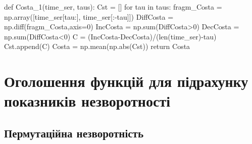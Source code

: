 \documentclass[
  letterpaper,
]{report}
\newenvironment{Shaded}{\begin{snugshade}}{\end{snugshade}}
\newcommand{\BuiltInTok}[1]{\textcolor[rgb]{0.00,0.23,0.31}{#1}}
\newcommand{\ControlFlowTok}[1]{\textcolor[rgb]{0.00,0.23,0.31}{#1}}
\newcommand{\DecValTok}[1]{\textcolor[rgb]{0.68,0.00,0.00}{#1}}
\newcommand{\KeywordTok}[1]{\textcolor[rgb]{0.00,0.23,0.31}{#1}}
\newcommand{\NormalTok}[1]{\textcolor[rgb]{0.00,0.23,0.31}{#1}}
\newcommand{\OperatorTok}[1]{\textcolor[rgb]{0.37,0.37,0.37}{#1}}
\begin{document}
\begin{Shaded}
\begin{Highlighting}[]
\KeywordTok{def}\NormalTok{ Costa\_1(time\_ser, taus):}
\NormalTok{    Cst }\OperatorTok{=}\NormalTok{ []}
    \ControlFlowTok{for}\NormalTok{ tau }\KeywordTok{in}\NormalTok{ taus:}
\NormalTok{        fragm\_Costa }\OperatorTok{=}\NormalTok{ np.array([time\_ser[tau:], time\_ser[:}\OperatorTok{{-}}\NormalTok{tau]])}
\NormalTok{        DiffCosta }\OperatorTok{=}\NormalTok{ np.diff(fragm\_Costa,axis}\OperatorTok{=}\DecValTok{0}\NormalTok{)}
\NormalTok{        IncCosta }\OperatorTok{=}\NormalTok{ np.}\BuiltInTok{sum}\NormalTok{(DiffCosta}\OperatorTok{\textgreater{}}\DecValTok{0}\NormalTok{)}
\NormalTok{        DecCosta }\OperatorTok{=}\NormalTok{ np.}\BuiltInTok{sum}\NormalTok{(DiffCosta}\OperatorTok{\textless{}}\DecValTok{0}\NormalTok{)}
\NormalTok{        C }\OperatorTok{=}\NormalTok{ (IncCosta}\OperatorTok{{-}}\NormalTok{DecCosta)}\OperatorTok{/}\NormalTok{(}\BuiltInTok{len}\NormalTok{(time\_ser)}\OperatorTok{{-}}\NormalTok{tau)}
\NormalTok{        Cst.append(C)}
\NormalTok{    Costa }\OperatorTok{=}\NormalTok{ np.mean(np.}\BuiltInTok{abs}\NormalTok{(Cst))}
    \ControlFlowTok{return}\NormalTok{ Costa}
\end{Highlighting}
\end{Shaded}

\hypertarget{ux43eux433ux43eux43bux43eux448ux435ux43dux43dux44f-ux444ux443ux43dux43aux446ux456ux439-ux434ux43bux44f-ux43fux456ux434ux440ux430ux445ux443ux43dux43aux443-ux43fux43eux43aux430ux437ux43dux438ux43aux456ux432-ux43dux435ux437ux432ux43eux440ux43eux442ux43dux43eux441ux442ux456}{%
\section{Оголошення функцій для підрахунку показників
незворотності}\label{ux43eux433ux43eux43bux43eux448ux435ux43dux43dux44f-ux444ux443ux43dux43aux446ux456ux439-ux434ux43bux44f-ux43fux456ux434ux440ux430ux445ux443ux43dux43aux443-ux43fux43eux43aux430ux437ux43dux438ux43aux456ux432-ux43dux435ux437ux432ux43eux440ux43eux442ux43dux43eux441ux442ux456}}

\hypertarget{ux43fux435ux440ux43cux443ux442ux430ux446ux456ux439ux43dux430-ux43dux435ux437ux432ux43eux440ux43eux442ux43dux456ux441ux442ux44c}{%
\subsection{Пермутаційна
незворотність}\label{ux43fux435ux440ux43cux443ux442ux430ux446ux456ux439ux43dux430-ux43dux435ux437ux432ux43eux440ux43eux442ux43dux456ux441ux442ux44c}}
\end{document}

